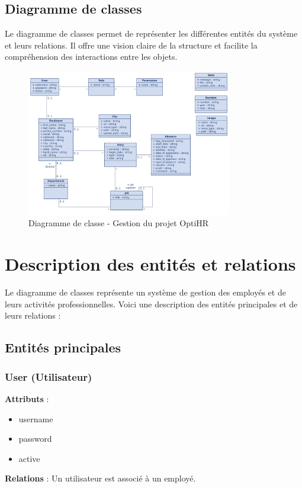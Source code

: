 \subsection{Diagramme de classes}
Le diagramme de classes permet de représenter les différentes entités du système et leurs relations. Il offre une vision claire de la structure et facilite la compréhension des interactions entre les objets.

\begin{figure}[H]
    \centering
    \includegraphics[width=0.8\textwidth]{images/diagrammes/class/diagramme.jpeg}
    \caption{Diagramme de classe - Gestion du projet OptiHR}
    \label{fig:class_diagramm_optiRH}
\end{figure}

\section{Description des entités et relations}

Le diagramme de classes représente un système de gestion des employés et de leurs activités professionnelles. Voici une description des entités principales et de leurs relations :

\subsection{Entités principales}

\subsubsection{User (Utilisateur)}
\textbf{Attributs} :
\begin{itemize}
    \item username
    \item password
    \item active
\end{itemize}
\textbf{Relations} : Un utilisateur est associé à un employé.

